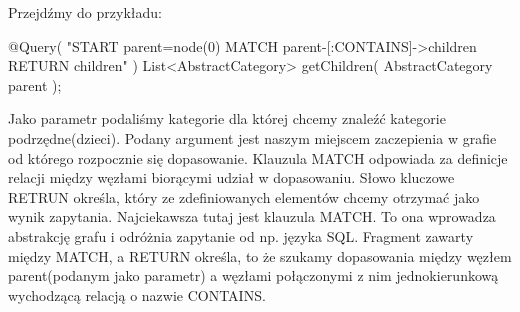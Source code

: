 Przejdźmy do przykładu:

@Query( "START parent=node({0}) MATCH parent-[:CONTAINS]->children RETURN children" )
List<AbstractCategory> getChildren( AbstractCategory parent );


Jako parametr podaliśmy kategorie dla której chcemy znaleźć kategorie podrzędne(dzieci). Podany argument jest naszym miejscem zaczepienia w grafie od którego rozpocznie się dopasowanie. Klauzula MATCH odpowiada za definicje relacji między węzłami biorącymi udział w dopasowaniu. Słowo kluczowe RETRUN określa, który ze zdefiniowanych elementów chcemy otrzymać jako wynik zapytania. Najciekawsza tutaj jest klauzula MATCH. To ona wprowadza abstrakcję grafu i odróżnia zapytanie od np. języka SQL. Fragment zawarty między MATCH, a RETURN określa, to że szukamy dopasowania między węzłem parent(podanym jako parametr) a węzłami połączonymi z nim  jednokierunkową wychodzącą relacją o nazwie CONTAINS. 
